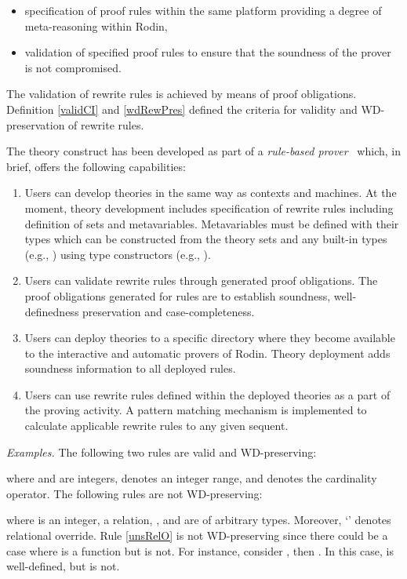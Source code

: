 \documentclass[copyright]{eptcs}
\begin{document}
\begin{itemize}
\item specification of proof rules within the same platform providing a degree of meta-reasoning within Rodin,
\item validation of specified proof rules to ensure that the soundness of the prover is not compromised.
\end{itemize}
The validation of rewrite rules is achieved by means of proof obligations. Definition \ref{validCI} and \ref{wdRewPres} defined the criteria for validity and WD-preservation of rewrite rules.
\par
The theory construct has been developed as part of a \textit{rule-based prover}~\cite{issam1984} which, in brief, offers the following capabilities:
\begin{enumerate}
\item Users can develop theories in the same way as contexts and machines. At the moment, theory development includes specification of rewrite rules including definition of sets and metavariables. Metavariables must be defined with their types which can be constructed from the theory sets and any built-in types (e.g., ) using type constructors (e.g., ).
\item Users can validate rewrite rules through generated proof obligations. The proof obligations generated for rules are to establish soundness, well-definedness preservation and case-completeness.
\item Users can deploy theories to a specific directory where they become available to the interactive and automatic provers of Rodin. Theory deployment adds soundness information to all deployed rules.
\item Users can use rewrite rules defined within the deployed theories as a part of the proving activity. A pattern matching mechanism is implemented to calculate applicable rewrite rules to any given sequent. 
\end{enumerate}
\vspace{2mm}
\textit{Examples.} The following two rules are valid and WD-preserving:

where  and  are integers,  denotes an integer range, and  denotes the cardinality operator. The following rules are not WD-preserving:

where  is an integer,  a relation, , and  are of arbitrary types. Moreover, `' denotes relational override. Rule \ref{unsRelO} is not WD-preserving since there could be a case where  is a function but  is not. For instance, consider , then 
. In this case,  is well-defined, but  is not.
\end{document}
